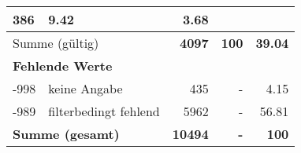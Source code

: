 \begin{longtable}{lXrrr}
       \num{386} &
       \num[round-mode=places,round-precision=2]{9.42} &
         \num[round-mode=places,round-precision=2]{3.68} \\
     \midrule
     \multicolumn{2}{l}{Summe (gültig)} &
       \textbf{\num{4097}} &
     \textbf{\num{100}} &
       \textbf{\num[round-mode=places,round-precision=2]{39.04}} \\
     \multicolumn{5}{l}{\textbf{Fehlende Werte}}\\
       -998 &
       keine Angabe &
         \num{435} &
        - &
         \num[round-mode=places,round-precision=2]{4.15} \\
       -989 &
       filterbedingt fehlend &
         \num{5962} &
        - &
         \num[round-mode=places,round-precision=2]{56.81} \\
     \midrule
     \multicolumn{2}{l}{\textbf{Summe (gesamt)}} &
          \textbf{\num{10494}} &
        \textbf{-} &
        \textbf{\num{100}} \\
     \bottomrule
     \end{longtable}
     
